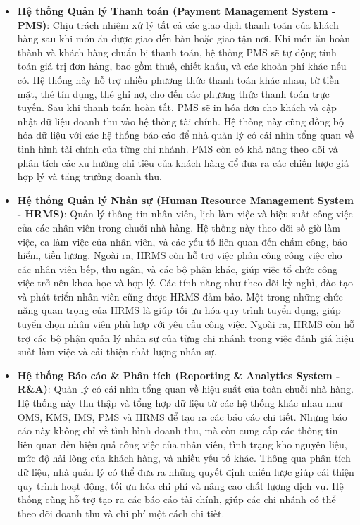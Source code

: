 \begin{itemize}
	\item \textbf{Hệ thống Quản lý Thanh toán (Payment Management System - PMS)}: Chịu trách nhiệm xử lý tất cả các giao dịch thanh toán của khách hàng sau khi món ăn được giao đến bàn hoặc giao tận nơi. Khi món ăn hoàn thành và khách hàng chuẩn bị thanh toán, hệ thống PMS sẽ tự động tính toán giá trị đơn hàng, bao gồm thuế, chiết khấu, và các khoản phí khác nếu có. Hệ thống này hỗ trợ nhiều phương thức thanh toán khác nhau, từ tiền mặt, thẻ tín dụng, thẻ ghi nợ, cho đến các phương thức thanh toán trực tuyến. Sau khi thanh toán hoàn tất, PMS sẽ in hóa đơn cho khách và cập nhật dữ liệu doanh thu vào hệ thống tài chính. Hệ thống này cũng đồng bộ hóa dữ liệu với các hệ thống báo cáo để nhà quản lý có cái nhìn tổng quan về tình hình tài chính của từng chi nhánh. PMS còn có khả năng theo dõi và phân tích các xu hướng chi tiêu của khách hàng để đưa ra các chiến lược giá hợp lý và tăng trưởng doanh thu.

	\item \textbf{Hệ thống Quản lý Nhân sự (Human Resource Management System - HRMS)}: Quản lý thông tin nhân viên, lịch làm việc và hiệu suất công việc của các nhân viên trong chuỗi nhà hàng. Hệ thống này theo dõi số giờ làm việc, ca làm việc của nhân viên, và các yếu tố liên quan đến chấm công, bảo hiểm, tiền lương. Ngoài ra, HRMS còn hỗ trợ việc phân công công việc cho các nhân viên bếp, thu ngân, và các bộ phận khác, giúp việc tổ chức công việc trở nên khoa học và hợp lý. Các tính năng như theo dõi kỳ nghỉ, đào tạo và phát triển nhân viên cũng được HRMS đảm bảo. Một trong những chức năng quan trọng của HRMS là giúp tối ưu hóa quy trình tuyển dụng, giúp tuyển chọn nhân viên phù hợp với yêu cầu công việc. Ngoài ra, HRMS còn hỗ trợ các bộ phận quản lý nhân sự của từng chi nhánh trong việc đánh giá hiệu suất làm việc và cải thiện chất lượng nhân sự.

	\item \textbf{Hệ thống Báo cáo \& Phân tích (Reporting \& Analytics System - R\&A)}: Quản lý có cái nhìn tổng quan về hiệu suất của toàn chuỗi nhà hàng. Hệ thống này thu thập và tổng hợp dữ liệu từ các hệ thống khác nhau như OMS, KMS, IMS, PMS và HRMS để tạo ra các báo cáo chi tiết. Những báo cáo này không chỉ về tình hình doanh thu, mà còn cung cấp các thông tin liên quan đến hiệu quả công việc của nhân viên, tình trạng kho nguyên liệu, mức độ hài lòng của khách hàng, và nhiều yếu tố khác. Thông qua phân tích dữ liệu, nhà quản lý có thể đưa ra những quyết định chiến lược giúp cải thiện quy trình hoạt động, tối ưu hóa chi phí và nâng cao chất lượng dịch vụ. Hệ thống cũng hỗ trợ tạo ra các báo cáo tài chính, giúp các chi nhánh có thể theo dõi doanh thu và chi phí một cách chi tiết.


\end{itemize}
